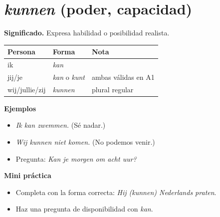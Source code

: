 \section{\textit{kunnen} (poder, capacidad)}
\textbf{Significado.} Expresa habilidad o posibilidad realista.

\begin{tabular}{@{}lll@{}}
\toprule
Persona & Forma & Nota \\
\midrule
ik & \textit{kan} &  \\
jij/je & \textit{kan} o \textit{kunt} & ambas válidas en A1 \\
wij/jullie/zij & \textit{kunnen} & plural regular \\
\bottomrule
\end{tabular}

\textbf{Ejemplos}
\begin{itemize}[leftmargin=*]
  \item \textit{Ik kan zwemmen.} (Sé nadar.)
  \item \textit{Wij kunnen niet komen.} (No podemos venir.)
  \item Pregunta: \textit{Kan je morgen om acht uur?}
\end{itemize}

\textbf{Mini práctica}
\begin{itemize}[leftmargin=*]
  \item Completa con la forma correcta: \textit{Hij \underline{\hspace{1.2cm}}\underline{\hspace{1.2cm}}\underline{\hspace{1.2cm}} (kunnen) Nederlands praten}.
  \item Haz una pregunta de disponibilidad con \textit{kan}.
\end{itemize}
